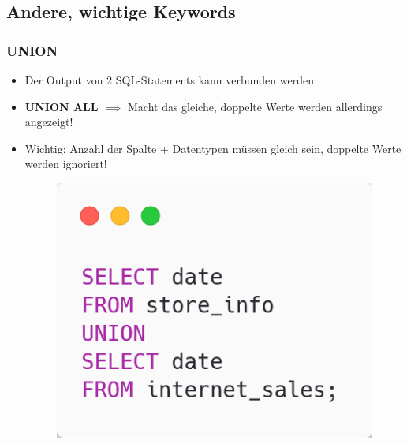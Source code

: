 \subsection{Andere, wichtige Keywords}
\subsubsection{UNION}
\begin{itemize}
    \item Der Output von 2 SQL-Statements kann verbunden werden
    \item \textbf{UNION ALL} $\implies$ Macht das gleiche, doppelte Werte werden allerdings angezeigt!
    \item Wichtig: Anzahl der Spalte + Datentypen müssen gleich sein, doppelte Werte werden ignoriert!
    \begin{figure}[H]
        \centering
        \includegraphics[scale=.4]{res/themenkorb_2/union.png} 
    \end{figure}
\end{itemize}

